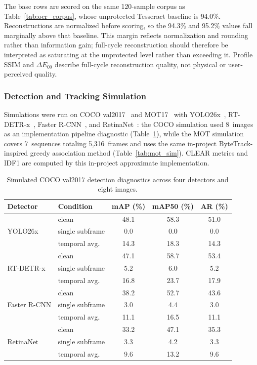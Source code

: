 \documentclass{ieeeaccess}
\begin{document}
The base rows are scored on the same 120-sample corpus as Table~\ref{tab:ocr_corpus}, whose unprotected Tesseract baseline is 94.0\%. Reconstructions are normalized before scoring, so the 94.3\% and 95.2\% values fall marginally above that baseline. This margin reflects normalization and rounding rather than information gain; full-cycle reconstruction should therefore be interpreted as saturating at the unprotected level rather than exceeding it. Profile SSIM and $\Delta E_{00}$ describe full-cycle reconstruction quality, not physical or user-perceived quality.

\subsubsection{Detection and Tracking Simulation}

Simulations were run on COCO val2017~\cite{b_coco2014} and MOT17~\cite{b_mot16} with YOLO26x~\cite{b_yolo26}, RT-DETR-x~\cite{b_rtdetr2024}, Faster R-CNN~\cite{b_fasterrcnn2015}, and RetinaNet~\cite{b_retinanet2017}: the COCO simulation used 8~images as an implementation pipeline diagnostic (Table~\ref{tab:coco_sim}), while the MOT simulation covers 7~sequences totaling 5,316~frames and uses the same in-project ByteTrack-inspired greedy association method (Table~\ref{tab:mot_sim}). CLEAR metrics and IDF1 are computed by this in-project approximate implementation.

\begin{table}[!t]
\caption{Simulated COCO val2017 detection diagnostics across four detectors and eight images.}
\label{tab:coco_sim}
\centering
\footnotesize
\setlength{\tabcolsep}{5pt}
\begin{tabular}{llccc}
\toprule
Detector & Condition & mAP (\%) & mAP50 (\%) & AR (\%) \\
\midrule
\multirow{3}{*}{YOLO26x}
 & clean & 48.1 & 58.3 & 51.0 \\
 & single subframe & 0.0 & 0.0 & 0.0 \\
 & temporal avg. & 14.3 & 18.3 & 14.3 \\
\midrule
\multirow{3}{*}{RT-DETR-x}
 & clean & 47.1 & 58.7 & 53.4 \\
 & single subframe & 5.2 & 6.0 & 5.2 \\
 & temporal avg. & 16.8 & 23.7 & 17.9 \\
\midrule
\multirow{3}{*}{Faster R-CNN}
 & clean & 38.2 & 52.7 & 43.6 \\
 & single subframe & 3.0 & 4.4 & 3.0 \\
 & temporal avg. & 11.1 & 16.5 & 11.1 \\
\midrule
\multirow{3}{*}{RetinaNet}
 & clean & 33.2 & 47.1 & 35.3 \\
 & single subframe & 3.3 & 4.2 & 3.3 \\
 & temporal avg. & 9.6 & 13.2 & 9.6 \\
\bottomrule
\end{tabular}
\end{table}
\end{document}
